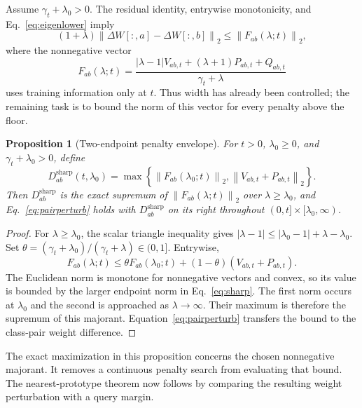 \documentclass[preprint,12pt,authoryear]{elsarticle}
\newtheorem{proposition}{Proposition}
\newcommand{\norm}[1]{\left\lVert#1\right\rVert}
\newcommand{\sharpb}{\mathrm{sharp}}
\begin{document}
Assume $\gamma_t+\lambda_0>0$. The residual identity, entrywise monotonicity, and Eq.~\eqref{eq:eigenlower} imply
\begin{equation}
 (1+\lambda)\norm{\Delta W[:,a]-\Delta W[:,b]}_2
 \leq\norm{F_{ab}(\lambda;t)}_2,
 \label{eq:pairperturb}
\end{equation}
where the nonnegative vector
\begin{equation}
 F_{ab}(\lambda;t)=
 \frac{|\lambda-1|V_{ab,t}+(\lambda+1)P_{ab,t}+Q_{ab,t}}
 {\gamma_t+\lambda}
 \label{eq:majorant}
\end{equation}
uses training information only at $t$. Thus width has already been controlled; the remaining task is to bound the norm of this vector for every penalty above the floor.

\begin{proposition}[Two-endpoint penalty envelope]
For $t>0$, $\lambda_0\geq0$, and $\gamma_t+\lambda_0>0$, define
\begin{equation}
 D^{\sharpb}_{ab}(t,\lambda_0)=
 \max\left\{\norm{F_{ab}(\lambda_0;t)}_2,
                  \norm{V_{ab,t}+P_{ab,t}}_2\right\}.
 \label{eq:sharp}
\end{equation}
Then $D^{\sharpb}_{ab}$ is the exact supremum of $\norm{F_{ab}(\lambda;t)}_2$ over $\lambda\geq\lambda_0$, and Eq.~\eqref{eq:pairperturb} holds with $D^{\sharpb}_{ab}$ on its right throughout $(0,t]\times[\lambda_0,\infty)$.
\end{proposition}
\begin{proof}
For $\lambda\geq\lambda_0$, the scalar triangle inequality gives
$|\lambda-1|\leq|\lambda_0-1|+\lambda-\lambda_0$. Set
$\theta=(\gamma_t+\lambda_0)/(\gamma_t+\lambda)\in(0,1]$. Entrywise,
\[
 F_{ab}(\lambda;t)
 \leq\theta F_{ab}(\lambda_0;t)
       +(1-\theta)(V_{ab,t}+P_{ab,t}).
\]
The Euclidean norm is monotone for nonnegative vectors and convex, so its value is bounded by the larger endpoint norm in Eq.~\eqref{eq:sharp}. The first norm occurs at $\lambda_0$ and the second is approached as $\lambda\to\infty$. Their maximum is therefore the supremum of this majorant. Equation~\eqref{eq:pairperturb} transfers the bound to the class-pair weight difference.
\end{proof}

The exact maximization in this proposition concerns the chosen nonnegative majorant. It removes a continuous penalty search from evaluating that bound. The nearest-prototype theorem now follows by comparing the resulting weight perturbation with a query margin.
\end{document}
